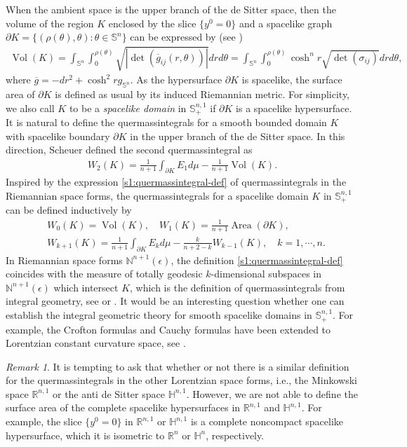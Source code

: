 \documentclass[11pt,reqno]{amsart}
\theoremstyle{definition}
\theoremstyle{remark}
\newtheorem{rem}{Remark}
\numberwithin{equation}{section}
\renewcommand{\(}{\left(}
\renewcommand{\)}{\right)}
\renewcommand{\~}{\tilde}
\renewcommand{\-}{\overline}
\newcommand{\e}{\epsilon}
\renewcommand{\t}{\theta}
\newcommand{\s}{\sigma}
\newcommand{\Vol}{\operatorname{Vol}}
\begin{document}
When the ambient space is the upper branch of the de Sitter space, then the volume of the region $K$ enclosed by the slice $\{y^0=0\}$ and a spacelike graph $\partial K=\{(\rho(\t),\t):\t \in \mathbb S^n\}$ can be expressed by (see \cite[Section 4]{Makowski2013})
\begin{align*}
\Vol(K)=\int_{\mathbb S^n} \int_0^{\rho(\t)} \sqrt{|\det(\-g_{ij}(r,\t))|} dr d\t=\int_{\mathbb S^n}\int_0^{\rho(\t)}\cosh^n r \sqrt{\det(\s_{ij})}dr d\t,
\end{align*}
where $\-g=-dr^2+\cosh^2r g_{\mathbb S^n}$. As the hypersurface $\partial K$ is spacelike, the surface area of $\partial K$ is defined as usual by its induced Riemannian metric. For simplicity, we also call $K$ to be a {\em spacelike domain} in $\mathbb S^{n,1}_{+}$ if $\partial K$ is a spacelike hypersurface. It is natural to define the quermassintegrals for a smooth bounded domain $K$ with spacelike boundary $\partial K$ in the upper branch of the de Sitter space. In this direction, Scheuer \cite{Scheuer19} defined the second quermassintegral as 
\begin{align*}
W_2(K)=\frac{1}{n+1}\int_{\partial K}E_{1}d\mu-\frac{1}{n+1}\Vol(K).
\end{align*}
Inspired by the expression \eqref{s1:quermassintegral-def} of quermassintegrals in the Riemannian space forms, the quermassintegrals for a spacelike domain $K$ in $\mathbb S_+^{n,1}$ can be defined inductively by
\begin{equation}\label{s1:quermassintegral-def-de-Sitter}
\begin{split}
&W_0(K)=\operatorname{Vol}(K), \quad  W_1(K)=\frac{1}{n+1}\operatorname{Area}(\partial K), \\
&W_{k+1}(K)=\frac{1}{n+1}\int_{\partial K}E_{k}d\mu-\frac{k}{n+2-k}W_{k-1}(K), \quad k=1,\cdots,n.
\end{split}
\end{equation}
In Riemannian space forms $\mathbb N^{n+1}(\e)$, the definition \eqref{s1:quermassintegral-def} coincides with the measure of totally geodesic $k$-dimensional subspaces in $\mathbb N^{n+1}(\e)$ which intersect $K$, which is the definition of quermassintegrals from integral geometry, see \cite{Sant2004} or \cite[Proposition 7]{Solanes06}. It would be an interesting question whether one can establish the integral geometric theory for smooth spacelike domains in $\mathbb S_+^{n,1}$. For example, the Crofton formulas and Cauchy formulas have been extended to Lorentzian constant curvature space, see \cite{Solanes-Teufel05}.
\begin{rem}
	It is tempting to ask that whether or not there is a similar definition for the quermassintegrals in the other Lorentzian space forms, i.e., the Minkowski space $\mathbb R^{n,1}$ or the anti de Sitter space $\mathbb H^{n,1}$. However, we are not able to define the surface area of the complete spacelike hypersurfaces in $\mathbb R^{n,1}$ and $\mathbb H^{n,1}$. For example, the slice $\{y^0=0\}$ in $\mathbb R^{n,1}$ or $\mathbb H^{n,1}$ is a complete noncompact spacelike hypersurface, which it is isometric to $\mathbb R^n$ or $\mathbb H^n$, respectively. 
\end{rem}
\end{document}
